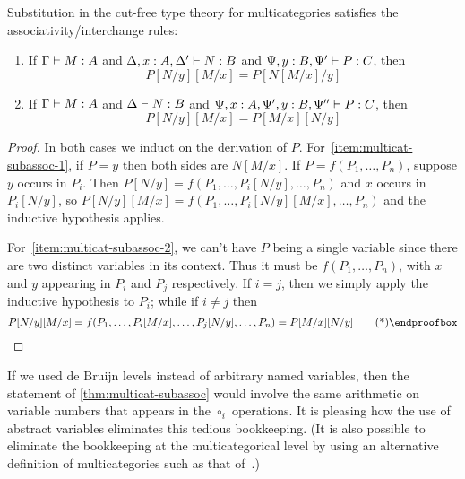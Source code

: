 \begin{thm}\label{thm:multicat-subassoc}
  Substitution in the cut-free type theory for multicategories satisfies the associativity/interchange rules:
  \begin{enumerate}
  \item If $\Gamma\vdash M:A$ and $\Delta,x:A,\Delta' \vdash N:B$ and $\Psi,y:B,\Psi'\vdash P:C$, then\label{item:multicat-subassoc-1}
    \[ P[N/y][M/x] = P[N[M/x]/y] \]
  \item If $\Gamma\vdash M:A$ and $\Delta \vdash N:B$ and $\Psi,x:A,\Psi',y:B,\Psi''\vdash P:C$, then\label{item:multicat-subassoc-2}
    \[ P[N/y][M/x] = P[M/x][N/y] \]
  \end{enumerate}
\end{thm}
\begin{proof}
  In both cases we induct on the derivation of $P$.
  For~\ref{item:multicat-subassoc-1}, if $P=y$ then both sides are $N[M/x]$.
  If $P=f(P_1,\dots,P_n)$, suppose $y$ occurs in $P_i$.
  Then $P[N/y] = f(P_1,\dots,P_i[N/y],\dots,P_n)$ and $x$ occurs in $P_i[N/y]$, so
  $P[N/y][M/x] = f(P_1,\dots,P_i[N/y][M/x],\dots,P_n)$ and the inductive hypothesis applies.

  For~\ref{item:multicat-subassoc-2}, we can't have $P$ being a single variable since there are two distinct variables in its context.
  Thus it must be $f(P_1,\dots,P_n)$, with $x$ and $y$ appearing in $P_i$ and $P_j$ respectively.
  If $i=j$, then we simply apply the inductive hypothesis to $P_i$; while if $i\neq j$ then
  \begin{equation*}
    P[N/y][M/x] = f(P_1,\dots,P_i[M/x],\dots,P_j[N/y],\dots,P_n) = P[M/x][N/y]\qedhere
  \end{equation*}
\end{proof}

If we used de Bruijn levels instead of arbitrary named variables, then the statement of \cref{thm:multicat-subassoc} would involve the same arithmetic on variable numbers that appears in the $\circ_i$ operations.
It is pleasing how the use of abstract variables eliminates this tedious bookkeeping.
(It is also possible to eliminate the bookkeeping at the multicategorical level by using an alternative definition of multicategories such as that of~\cite[Appendix A]{leinster:higher-opds}.)

